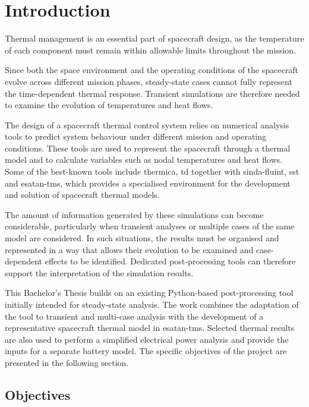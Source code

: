 \chapter{Introduction}
\label{ch:introduction}

Thermal management is an essential part of spacecraft design, as the temperature
of each component must remain within allowable limits throughout the
mission. 

Since both the space environment and the operating conditions of the
spacecraft evolve across different mission phases, steady-state cases cannot fully represent the time-dependent thermal response. 
Transient simulations are therefore needed to examine the evolution of temperatures and heat flows.

The design of a spacecraft thermal control system relies on numerical analysis
tools to predict system behaviour under different mission and operating
conditions. These tools are used to represent the spacecraft through a thermal
model and to calculate variables such as nodal temperatures and heat flows.
Some of the best-known tools include \acrshort{thermica}, \acrlong{td} together with \acrshort{sinda-fluint}, 
\acrfull{sst} and \acrshort{esatan-tms}, which provides a specialised 
environment for the development and solution of spacecraft thermal models.

The amount of information generated by these simulations can become
considerable, particularly when transient analyses or multiple cases of the
same model are considered. In such situations, the results must be organised
and represented in a way that allows their evolution to be examined and
case-dependent effects to be identified. Dedicated
post-processing tools can therefore support the interpretation of the
simulation results.

This Bachelor’s Thesis builds on an existing Python-based post-processing tool
initially intended for steady-state analysis. The work combines the adaptation
of the tool to transient and multi-case analysis with the development of a
representative spacecraft thermal model in \acrshort{esatan-tms}. Selected
thermal results are also used to perform a simplified electrical power
analysis and provide the inputs for a separate battery model. The specific
objectives of the project are presented in the following section.

\section{Objectives}
\label{sec:objectives}

